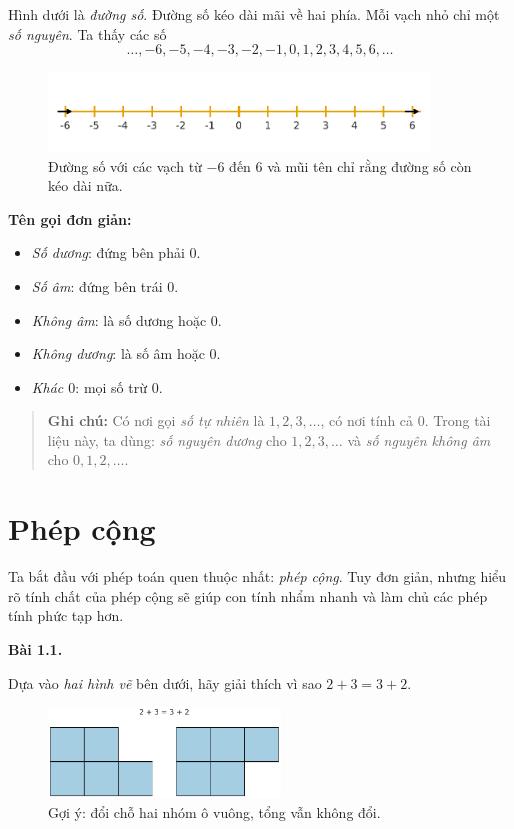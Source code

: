\documentclass[12pt,a4paper]{book}
\newenvironment{problem}[1][]{
  \par\noindent\textbf{Bài #1.}\ \ignorespaces
}{\par}
\begin{document}
Hình dưới là \emph{đường số}. Đường số kéo dài mãi về hai phía.
Mỗi vạch nhỏ chỉ một \emph{số nguyên}. Ta thấy các số
\[
\ldots,-6,-5,-4,-3,-2,-1,0,1,2,3,4,5,6,\ldots
\]

\begin{figure}[ht!]
  \centering
  \includegraphics[width=0.9\textwidth]{img/fig-numberline.pdf}
  \caption*{\small Đường số với các vạch từ $-6$ đến $6$ và mũi tên chỉ rằng
  đường số còn kéo dài nữa.}
\end{figure}

\noindent\textbf{Tên gọi đơn giản:}
\begin{itemize}
  \item \textit{Số dương}: đứng bên phải $0$.
  \item \textit{Số âm}: đứng bên trái $0$.
  \item \textit{Không âm}: là số dương hoặc $0$.
  \item \textit{Không dương}: là số âm hoặc $0$.
  \item \textit{Khác $0$}: mọi số trừ $0$.
\end{itemize}

\begin{quote}
\textbf{Ghi chú:} Có nơi gọi \emph{số tự nhiên} là $1,2,3,\ldots$,
có nơi tính cả $0$. Trong tài liệu này, ta dùng: \emph{số nguyên dương}
cho $1,2,3,\ldots$ và \emph{số nguyên không âm} cho $0,1,2,\ldots$.
\end{quote}


\section{Phép cộng}

Ta bắt đầu với phép toán quen thuộc nhất: \emph{phép cộng}.
Tuy đơn giản, nhưng hiểu rõ tính chất của phép cộng sẽ giúp con
tính nhẩm nhanh và làm chủ các phép tính phức tạp hơn.

\begin{problem}[1.1]
Dựa vào \emph{hai hình vẽ} bên dưới, hãy giải thích vì sao
$2+3=3+2$.

\begin{figure}[h!]
  \centering
  \includegraphics[width=0.55\textwidth]{img/fig-prob1.1.pdf}
  \caption*{\small Gợi ý: đổi chỗ hai nhóm ô vuông, tổng vẫn không đổi.}
\end{figure}
\end{problem}
\end{document}
